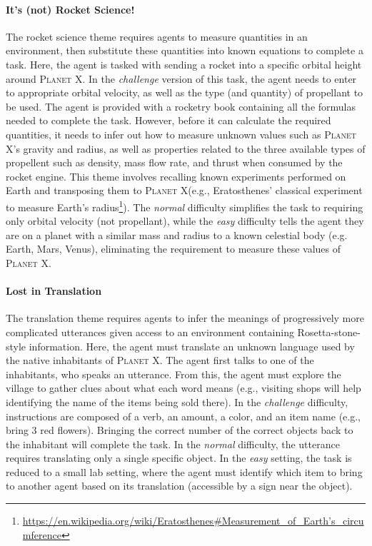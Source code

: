 \documentclass{article}
\newcommand{\planetX}{\textsc{Planet X}\xspace}
\begin{document}
\paragraph{It's (not) Rocket Science!} The rocket science theme requires agents to measure quantities in an environment, then substitute these quantities into known equations to complete a task.  Here, the agent is tasked with sending a rocket into a specific orbital height around \planetX. In the \textit{challenge} version of this task, the agent needs to enter to appropriate orbital velocity, as well as the type (and quantity) of propellant to be used. The agent is provided with a rocketry book containing all the formulas needed to complete the task. However, before it can calculate the required quantities, it needs to infer out how to measure unknown values such as \planetX's gravity and radius, as well as properties related to the three available types of propellent such as density, mass flow rate, and thrust when consumed by the rocket engine.  This theme involves recalling known experiments performed on Earth and transposing them to \planetX (e.g., Eratosthenes' classical experiment to measure Earth's radius\footnote{\href{https://en.wikipedia.org/wiki/Eratosthenes\#Measurement_of_Earth's_circumference}{https://en.wikipedia.org/wiki/Eratosthenes\#Measurement\_of\_Earth's\_circumference}}).  The \textit{normal} difficulty simplifies the task to requiring only orbital velocity (not propellant), while the \textit{easy} difficulty tells the agent they are on a planet with a similar mass and radius to a known celestial body (e.g. Earth, Mars, Venus), eliminating the requirement to measure these values of \planetX.

\paragraph{Lost in Translation} The translation theme requires agents to infer the meanings of progressively more complicated utterances given access to an environment containing Rosetta-stone-style information.  Here, the agent must translate an unknown language used by the native inhabitants of \planetX. The agent first talks to one of the inhabitants, who speaks an utterance.  From this, the agent must explore the village to gather clues about what each word means (e.g., visiting shops will help identifying the name of the items being sold there). In the \textit{challenge} difficulty, instructions are composed of a verb, an amount, a color, and an item name (e.g., bring 3 red flowers). Bringing the correct number of the correct objects back to the inhabitant will complete the task.  In the \textit{normal} difficulty, the utterance requires translating only a single specific object.  In the \textit{easy} setting, the task is reduced to a small lab setting, where the agent must identify which item to bring to another agent based on its translation (accessible by a sign near the object).
\end{document}
